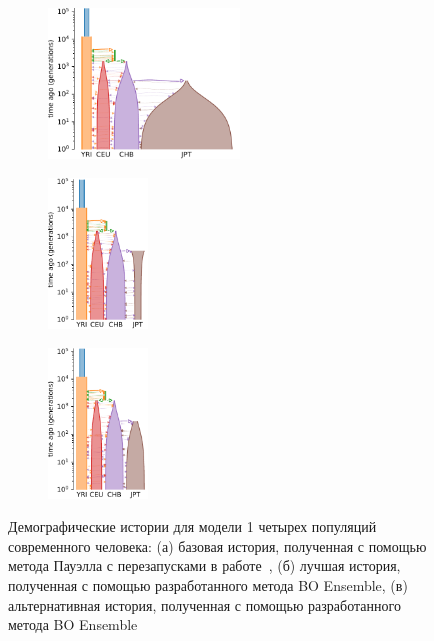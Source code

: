 \begin{figure}[t!]
    \centering
    \captionsetup[subfigure]{justification=centering}
    \begin{subfigure}[t]{0.48\textwidth}
        \includegraphics[height=4cm]{images_experiments/bo_human/YRI_CEU_CHB_JPT_original.pdf}
        \caption{}%
        \label{fig:4pop_a}
    \end{subfigure}%
    \begin{subfigure}[t]{0.25\textwidth}
        \includegraphics[height=4cm]{images_experiments/bo_human/YRI_CEU_CHB_JPT_1.pdf}
        \caption{}%
        \label{fig:4pop_b}
    \end{subfigure}%
    \begin{subfigure}[t]{0.25\textwidth}
        \includegraphics[height=4cm]{images_experiments/bo_human/YRI_CEU_CHB_JPT_2.pdf}
        \caption{}%
        \label{fig:4pop_c}
    \end{subfigure}
    \caption{Демографические истории для модели 1 четырех популяций современного человека: (а) базовая история, полученная с помощью метода Пауэлла с перезапусками в работе~\cite{jouganous2017inferring}, (б) лучшая история, полученная с помощью разработанного метода BO Ensemble, (в) альтернативная история, полученная с помощью разработанного метода BO Ensemble}
    \label{fig:4pops_histories}
\end{figure}

